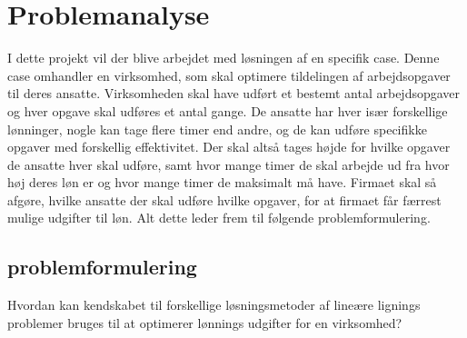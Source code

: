 \section{Problemanalyse}
I dette projekt vil der blive arbejdet med løsningen af en specifik case. 
Denne case omhandler en virksomhed, som skal optimere tildelingen af arbejdsopgaver til deres ansatte.
Virksomheden skal have udført et bestemt antal arbejdsopgaver og hver opgave skal udføres et antal gange. 
De ansatte har hver især forskellige lønninger, nogle kan tage flere timer end andre, og de kan udføre specifikke opgaver med forskellig effektivitet.
Der skal altså tages højde for hvilke opgaver de ansatte hver skal udføre, samt hvor mange timer de skal arbejde ud fra hvor høj deres løn er og hvor mange timer de maksimalt må have.
Firmaet skal så afgøre, hvilke ansatte der skal udføre hvilke opgaver, for at firmaet får færrest mulige udgifter til løn. 
Alt dette leder frem til følgende problemformulering.

\subsection{problemformulering}
Hvordan kan kendskabet til forskellige løsningsmetoder af lineære lignings problemer bruges til at optimerer lønnings udgifter for en virksomhed?
